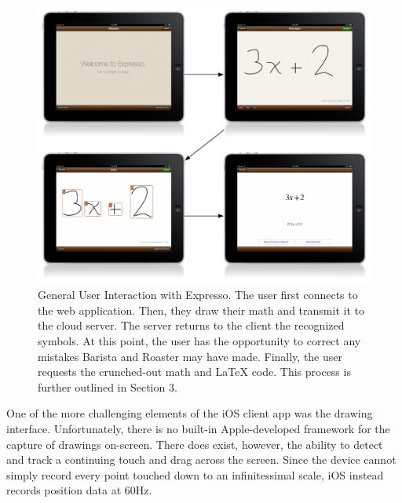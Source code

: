 \documentclass{acm_proc_article-sp}
\begin{document}
\begin{figure}
\centering
\includegraphics[width=1.0\textwidth]{user_workflow.pdf}
\caption{General User Interaction with Expresso. The user first connects to the web application. Then, they draw their math and transmit it to the cloud server. The server returns to the client the recognized symbols. At this point, the user has the opportunity to correct any mistakes Barista and Roaster may have made. Finally, the user requests the crunched-out math and \LaTeX{} code. This process is further outlined in Section 3.}
\label{fig:user_workflow}
\end{figure}

One of the more challenging elements of the iOS client app was the drawing interface. Unfortunately, there is no built-in Apple-developed framework for the capture of drawings on-screen. There does exist, however, the ability to detect and track a continuing touch and drag across the screen. Since the device cannot simply record every point touched down to an infinitessimal scale, iOS instead records position data at 60Hz.
\end{document}
